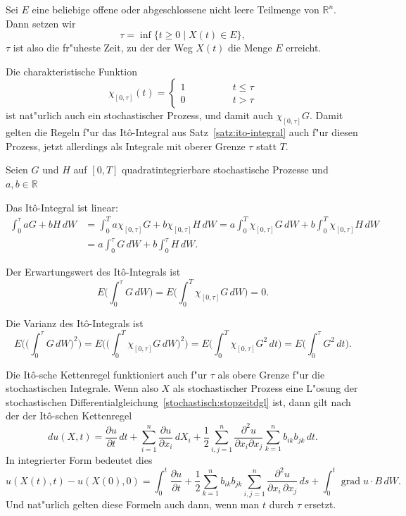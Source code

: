 \begin{definition}
Sei $E$ eine beliebige offene oder abgeschlossene nicht leere Teilmenge
von $\mathbb R^n$.
Dann setzen wir
\[
\tau = \inf\{t\ge 0\;|\;X(t)\in E\},
\]
$\tau$ ist also die fr"uheste Zeit, zu der der Weg $X(t)$ die Menge $E$
erreicht.
\end{definition}

Die charakteristische Funktion
%
%
\[
\chi_{[0,\tau]}(t)=\begin{cases}
1\qquad\qquad&t\le \tau\\
0            &t>\tau
\end{cases}
\]
ist nat"urlich auch ein stochastischer Prozess, und damit auch 
$\chi_{[0,\tau]}G$.
Damit gelten die Regeln f"ur das It\^o-Integral aus
Satz~\ref{satz:ito-integral} auch f"ur diesen Prozess, jetzt allerdings
als Integrale mit oberer Grenze $\tau$ statt $T$.

\begin{hilfssatz}
Seien $G$ und $H$ auf $[0,T]$ quadratintegrierbare stochastische Prozesse
und $a,b\in\mathbb R$
\begin{compactenum}
\item
Das It\^o-Integral ist linear:
\begin{align*}
\int_0^\tau aG+bH\,dW
&=
\int_0^T a\chi_{[0,\tau]} G + b \chi_{[0,\tau]} H\,dW
=
a\int_0^T \chi_{[0,\tau]} G\,dW + b \int_0^T\chi_{[0,\tau]} H\,dW
\\
&=
a\int_0^\tau G\,dW + b \int_0^\tau H\,dW.
\end{align*}
\item Der Erwartungswert des It\^o-Integrals ist
\[
E\biggl(\int_0^\tau G\,dW\biggr)
=
E\biggl(\int_0^T \chi_{[0,\tau]}G\,dW\biggr)
=
0.
\]
\item Die Varianz des It\^o-Integrals ist
\[
E\biggl(\biggl(\int_0^\tau G\,dW\biggr)^2\biggr)
=
E\biggl(\biggl(\int_0^T \chi_{[0,\tau]}G\,dW\biggr)^2\biggr)
=
E\biggl(\int_0^T\chi_{[0,\tau]}G^2\,dt\biggr)
=
E\biggl(\int_0^\tau G^2\,dt\biggr).
\]
\end{compactenum}
\end{hilfssatz}

Die It\^o-sche Kettenregel funktioniert auch f"ur $\tau$ als obere
Grenze f"ur die stochastischen Integrale.
Wenn also $X$ als stochastischer Prozess eine L"osung der stochastischen
Differentialgleichung~\eqref{stochastisch:stopzeitdgl} ist, dann gilt
nach der der It\^o-schen Kettenregel
\[
du(X,t)
=
\frac{\partial u}{\partial t}\,dt
+
\sum_{i=1}^n\frac{\partial u}{\partial x_i}\,dX_i
+
\frac12\sum_{i,j=1}^n\frac{\partial^2 u}{\partial x_i\partial x_j}
\sum_{k=1}^n b_{ik}b_{jk}\,dt.
\]
In integrierter Form bedeutet dies
\begin{equation}
u(X(t),t)-u(X(0),0)
=
\int_0^t
\frac{\partial u}{\partial t}
+
\frac12\sum_{k=1}^nb_{ik}b_{jk}
\sum_{i,j=1}^n \frac{\partial^2u}{\partial x_i\,\partial x_j} \,ds
+
\int_0^t \operatorname{grad} u\cdot B\,dW.
\label{stochastisch:uinkrement}
\end{equation}
Und nat"urlich gelten diese Formeln auch dann, wenn man $t$ durch $\tau$
ersetzt.

